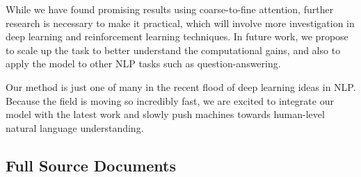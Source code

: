 \documentclass[12pt]{report}
\begin{document}
While we have found promising results using coarse-to-fine attention, further research is necessary to make it practical, which will involve more investigation in deep learning and reinforcement learning techniques. In future work, we propose to scale up the task to better understand the computational gains, and also to apply the model to other NLP tasks such as question-answering.

Our method is just one of many in the recent flood of deep learning ideas in NLP.
Because the field is moving so incredibly fast, we are excited to integrate our model with the latest work and slowly push machines towards human-level natural language understanding.





\begin{appendices}


\chapter{Full Source Documents}
\label{appendix:full_docs}


\end{appendices}
\end{document}

